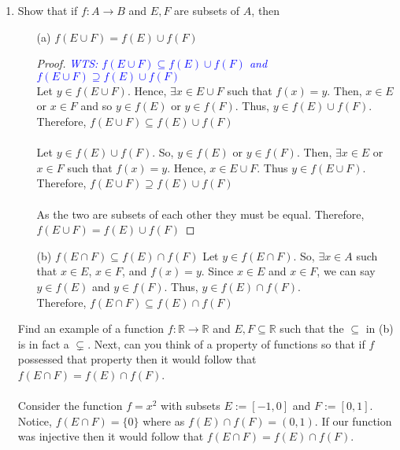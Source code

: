 \documentclass[12pt]{article}
\newcommand{\wts}[1]{\textit{\textcolor{blue}{WTS: #1}}\\}
\begin{document}
\begin{enumerate}
\newpage
    
    \item Show that if $f:A \to B$ and $E, F$ are subsets of $A$, then
    \begin{itemize}
        \item[(a)] $f(E \cup F) = f(E) \cup f(F)$
        \begin{proof}
        	\wts{$ f(E \cup F) \subseteq f(E) \cup f(F) $ and $ f(E \cup F) \supseteq f(E) \cup f(F)$ }
        	Let $ y\in f(E\cup F) $. Hence, $ \exists x\in E \cup F$ such that $ f(x)=y $. Then, $ x\in E$ or $ x\in F $ and so $ y\in f(E) $ or $ y\in f(F) $. Thus, $ y\in f(E)\cup f(F) $. Therefore, $ f(E \cup F) \subseteq f(E) \cup f(F) $ \\
        	\\
        	Let $ y\in f(E)\cup f(F) $. So, $ y\in f(E) $ or $ y\in f(F) $. Then, $ \exists x\in E $ or $ x\in F $ such that $ f(x)=y $. Hence, $ x\in E\cup F.$ Thus $ y\in f(E\cup F) $. Therefore, $ f(E \cup F) \supseteq f(E) \cup f(F)$\\
        	\\
        	As the two are subsets of each other they must be equal. Therefore, $f(E \cup F) = f(E) \cup f(F)$
        \end{proof}
        \item[(b)] $f(E \cap F) \subseteq f(E) \cap f(F)$
        Let $ y \in f(E\cap F) $. So, $\exists x\in A$ such that $ x\in E $, $ x\in F $, and $ f(x)=y $. Since $ x\in E $ and $ x\in F $, we can say $ y\in f(E) $ and $ y\in f(F) $. Thus, $ y\in f(E)\cap f(F) $.\\
        Therefore, $f(E \cap F) \subseteq f(E) \cap f(F)$
    \end{itemize}    
    Find an example of a function $f: \mathbb{R} \to \mathbb{R}$ and $E, F \subseteq \mathbb{R}$ such that the $\subseteq$ in (b) is in fact a $\subsetneq$. Next, can you think of a property of functions so that if $f$ possessed that property then it would follow that $f(E \cap F) = f(E) \cap f(F)$.\\
    \\
    Consider the function $ f=x^2 $ with subsets $ E:=[-1,0] $ and $ F:=[0,1] $. Notice, $ f(E\cap F) = \{0\} $ where as $ f(E)\cap f(F) = (0,1)  $. If our function was injective then it would follow that $f(E \cap F) = f(E) \cap f(F)$.


\end{enumerate}
\end{document}
